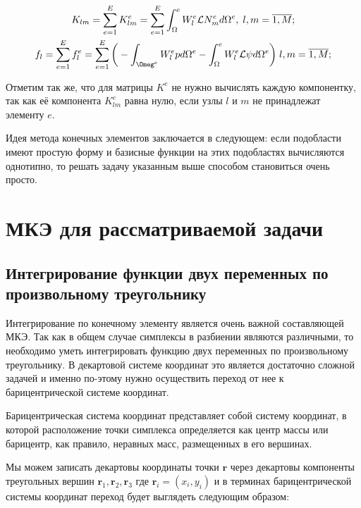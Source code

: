\documentclass[14pt]{extreport}
\begin{document}
\begin{gather}
	K_{lm}=\sum\limits_{e=1}^{E} K_{lm}^{e}=\sum\limits_{e=1}^{E}\int_\Omega^{e} W_l^{e} \mathcal L N_{m}^{e}  d\Omega^{e}, \; l,m=\overline{1,M}; \\
f_l=\sum\limits_{e=1}^{E} f_{l}^{e}=\sum\limits_{e=1}^{E} \bigg(-\int_{\Omeg^{e}} W_{l}^{e} p d \Omega^{e} -\int_\Omega^{e} W_{l}^{e} \mathcal L \psi d \Omega^{e}\bigg) \; l,m=\overline{1,M};
\end{gather}



Отметим так же, что для матрицы $K^{e}$ не нужно вычислять каждую компонентку, так как её компонента $K_{lm}^{e}$ равна нулю, если узлы $l$ и $m$ не принадлежат элементу $e$. 

Идея метода конечных элементов заключается в следующем: если подобласти имеют простую форму и базисные функции на этих подобластях вычисляются однотипно, то решать задачу указанным выше способом становиться очень просто. 


\section{МКЭ для рассматриваемой задачи}


\subsection{Интегрирование функции двух переменных по произвольному треугольнику}

Интегрирование по конечному элементу является очень важной составляющей МКЭ. Так как в общем случае симплексы в разбиении являются различными, то необходимо уметь интегрировать функцию двух переменных по произвольному треугольнику. В декартовой системе координат это является достаточно сложной задачей и именно по-этому нужно осуществить переход от нее к барицентрической системе координат. 



Барицентрическая система координат представляет собой систему координат, в которой расположение точки симплекса определяется как центр массы или барицентр, как правило, неравных масс, размещенных в его вершинах. 

Мы можем записать декартовы координаты точки $\mathbf{r}$ через декартовы компоненты треугольных вершин $\mathbf{r}_1, \mathbf{r}_2, \mathbf{r}_3$ где $\mathbf{r}_i = (x_i, y_i)$  и в терминах барицентрической системы координат переход будет выглядеть следующим образом:
\end{document}
